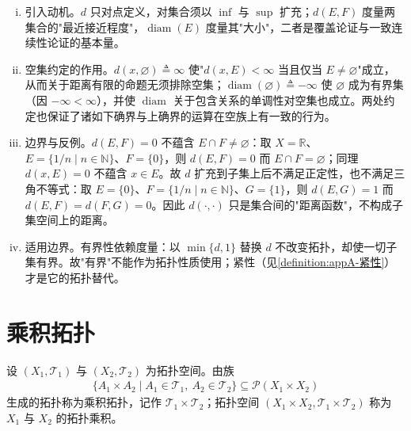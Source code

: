 \documentclass[../main.tex]{subfiles}
\begin{document}
\begin{remark}\label{remark:appA-距离直径}
\begin{enumerate}[(i)]
\item 引入动机。$d$ 只对点定义，对集合须以 $\inf$ 与 $\sup$ 扩充；$d(E,F)$ 度量两集合的"最近接近程度"，$\operatorname{diam}(E)$ 度量其"大小"，二者是覆盖论证与一致连续性论证的基本量。
\item 空集约定的作用。$d(x,\varnothing)\triangleq\infty$ 使"$d(x,E)<\infty$ 当且仅当 $E\neq\varnothing$"成立，从而关于距离有限的命题无须排除空集；$\operatorname{diam}(\varnothing)\triangleq-\infty$ 使 $\varnothing$ 成为有界集（因 $-\infty<\infty$），并使 $\operatorname{diam}$ 关于包含关系的单调性对空集也成立。两处约定也保证了诸如下确界与上确界的运算在空族上有一致的行为。
\item 边界与反例。$d(E,F)=0$ 不蕴含 $E\cap F\neq\varnothing$：取 $X=\mathbb{R}$、$E=\{1/n\mid n\in\mathbb{N}\}$、$F=\{0\}$，则 $d(E,F)=0$ 而 $E\cap F=\varnothing$；同理 $d(x,E)=0$ 不蕴含 $x\in E$。故 $d$ 扩充到子集上后不满足正定性，也不满足三角不等式：取 $E=\{0\}$、$F=\{1/n\mid n\in\mathbb{N}\}$、$G=\{1\}$，则 $d(E,G)=1$ 而 $d(E,F)=d(F,G)=0$。因此 $d(\cdot,\cdot)$ 只是集合间的"距离函数"，不构成子集空间上的距离。
\item 适用边界。有界性依赖度量：以 $\min\{d,1\}$ 替换 $d$ 不改变拓扑，却使一切子集有界。故"有界"不能作为拓扑性质使用；紧性（见\cref{definition:appA-紧性}）才是它的拓扑替代。
\end{enumerate}
\end{remark}

\section{乘积拓扑}\label{section:appA-乘积拓扑}

\begin{definition}[乘积拓扑]\label{definition:appA-乘积拓扑}
设 $(X_1,\mathscr{T}_1)$ 与 $(X_2,\mathscr{T}_2)$ 为拓扑空间。由族
\begin{align*}
\{A_1\times A_2\mid A_1\in\mathscr{T}_1,\ A_2\in\mathscr{T}_2\}\subseteq\mathcal{P}(X_1\times X_2)
\end{align*}
生成的拓扑称为乘积拓扑，记作 $\mathscr{T}_1\times\mathscr{T}_2$；拓扑空间 $(X_1\times X_2,\mathscr{T}_1\times\mathscr{T}_2)$ 称为 $X_1$ 与 $X_2$ 的拓扑乘积。
\end{definition}
\end{document}
